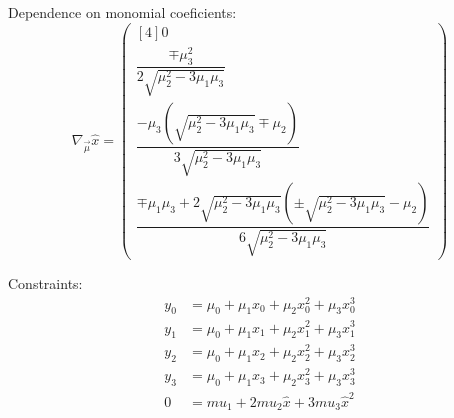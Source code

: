 Dependence on monomial coeficients:
\begin{equation}
\nabla_{\vec{\mu}} \hat{x} =
\begin{pmatrix}[4]
0 
\\
\dfrac{
\mp \mu_3^{2}
}{
2 \sqrt{\mu_2^{2} -3 \mu_1 \mu_3}
}
\\
\dfrac{
-\mu_3 \left(\sqrt{\mu_2^{2} -3 \mu_1 \mu_3} \mp \mu_2\right)
}{
3 \sqrt{\mu_2^{2} -3 \mu_1 \mu_3}
}
\\
\dfrac{
\mp \mu_1 \mu_3
+ 2 \sqrt{\mu_2^{2} - 3 \mu_1 \mu_3}
\left(\pm \sqrt{\mu_2^{2} - 3 \mu_1 \mu_3}  - \mu_2 \right)
}{
6 \sqrt{\mu_2^{2} -3 \mu_1 \mu_3}
}
\end{pmatrix}
\end{equation}

\label{sec:monomial-yyyy}

Constraints:
\begin{align}
y_0 & = \mu_0 + \mu_1 x_0 + \mu_2 x_0^2 + \mu_3 x_0^3
\\
y_1 & = \mu_0 + \mu_1 x_1 + \mu_2 x_1^2 + \mu_3 x_1^3
\nonumber
\\
y_2 & = \mu_0 + \mu_1 x_2 + \mu_2 x_2^2 + \mu_3 x_2^3
\\
y_3 & = \mu_0 + \mu_1 x_3 + \mu_2 x_3^2 + \mu_3 x_3^3
\nonumber
\\
0 & =  mu_1 + 2 mu_2 \hat{x} + 3 mu_3 \hat{x}^2
\nonumber
\end{align}

